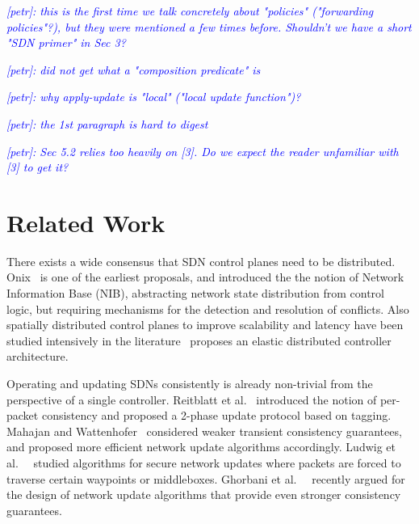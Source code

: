 \documentclass[conference]{sigcomm-alternate}
\newcommand{\petr}[1]{\textit{\textcolor{blue}{[petr]: #1}}} %
\begin{document}

\petr{this is the first time we talk concretely about "policies" ("forwarding policies"?), but they were mentioned a few times before. Shouldn't we have a short "SDN primer" in Sec 3?}

\petr{did not get what a "composition predicate" is}

\petr{why apply-update is "local" ("local update function")?}

\petr{the 1st paragraph is hard to digest}

\petr{Sec 5.2 relies too heavily on [3]. Do we expect the reader unfamiliar with [3] to get it?}

\section{Related Work}\label{sec:relwork}

There exists a wide consensus that SDN control planes need to be distributed.~\cite{onos,onix,elasticon}
Onix~\cite{onix} is one of the earliest proposals, and introduced the
the notion of Network Information Base (NIB), abstracting network state
distribution from control logic, but
requiring mechanisms for the detection and resolution of conflicts.
Also spatially distributed control planes to improve scalability and
latency have been studied intensively
in the literature~\cite{kandoo,ctrl-place,hotsdn13loc}
proposes an elastic distributed controller architecture.

Operating and updating SDNs consistently is already non-trivial
from the perspective of a single controller. Reitblatt et al.~\cite{network-update}
introduced the notion of
per-packet consistency and proposed a 2-phase update protocol based on tagging.
Mahajan and Wattenhofer~\cite{roger-hotnets} considered weaker transient
consistency guarantees, and proposed more efficient network update algorithms
accordingly. Ludwig et al.~~\cite{hotnets14update} studied algorithms for secure
network updates where packets are forced to traverse certain waypoints or
middleboxes. Ghorbani et al.~~\cite{correct-virt} recently argued for the design
of network update algorithms that provide even stronger consistency guarantees.
\end{document}
